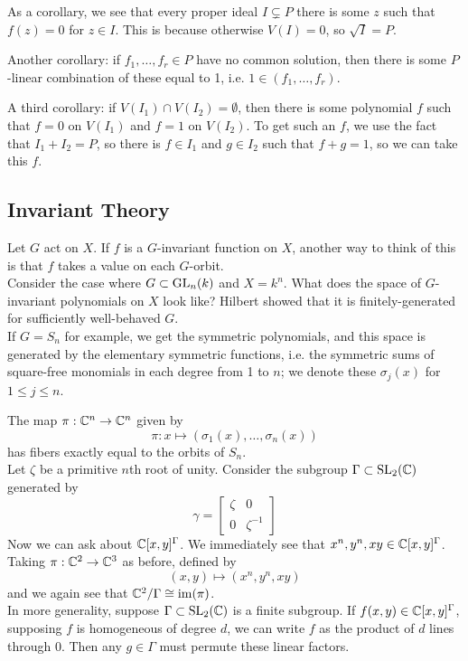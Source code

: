 \documentclass{amsart}
\begin{document}
As a corollary, we see that every proper ideal $I\subsetneq P$ there is some $z$ such that $f(z)=0$ for $z\in I$. This is because otherwise $V(I)=0$, so $\sqrt{I}=P$.

Another corollary: if $f_1,\dots,f_r\in P$ have no common solution, then there is some $P$-linear combination of these equal to 1, i.e. $1\in (f_1,\dots,f_r)$.

A third corollary: if $V(I_1)\cap V(I_2)=\emptyset$, then there is some polynomial $f$ such that $f=0$ on $V(I_1)$ and $f=1$ on $V(I_2)$. To get such an $f$, we use the fact that $I_1+I_2=P$, so there is $f\in I_1$ and $g\in I_2$ such that $f+g=1$, so we can take this $f$.\\

\subsection{Invariant Theory} Let $G$ act on $X$. If $f$ is a $G$-invariant function on $X$, another way to think of this is that $f$ takes a value on each $G$-orbit.\\

Consider the case where $G\subset \operatorname{GL}_n(k)$ and $X=k^n$. What does the space of $G$-invariant polynomials on $X$ look like? Hilbert showed that it is finitely-generated for sufficiently well-behaved $G$.\\

If $G=S_n$ for example, we get the symmetric polynomials, and this space is generated by the elementary symmetric functions, i.e. the symmetric sums of square-free monomials in each degree from 1 to $n$; we denote these $\sigma_j(x)$ for $1\leq j \leq n$.

The map $\pi:\mathbb{C}^n\to \mathbb{C}^n$ given by
$$
\pi: x\mapsto (\sigma_1(x),\dots,\sigma_n(x))
$$
has fibers exactly equal to the orbits of $S_n$.\\

Let $\zeta$ be a primitive $n$th root of unity. Consider the subgroup $\Gamma\subset \operatorname{SL}_2(\mathbb{C})$ generated by
$$
\gamma = \begin{bmatrix}
	\zeta & 0 \\
	0 & \zeta^{-1}
\end{bmatrix}
$$
Now we can ask about $\mathbb{C}[x,y]^{\Gamma}$. We immediately see that $x^n,y^n,xy\in \mathbb{C}[x,y]^{\Gamma}$. Taking $\pi:\mathbb{C}^2\to \mathbb{C}^3$ as before, defined by
$$
(x,y)\mapsto (x^n,y^n,xy)
$$
and we again see that $\mathbb{C}^2/\Gamma \cong \operatorname{im}(\pi)$.\\

In more generality, suppose $\Gamma \subset \operatorname{SL}_2(\mathbb{C})$ is a finite subgroup. If $f(x,y)\in \mathbb{C}[x,y]^{\Gamma}$, supposing $f$ is homogeneous of degree $d$, we can write $f$ as the product of $d$ lines through $0$. Then any $g\in \Gamma$ must permute these linear factors. \\
\end{document}
